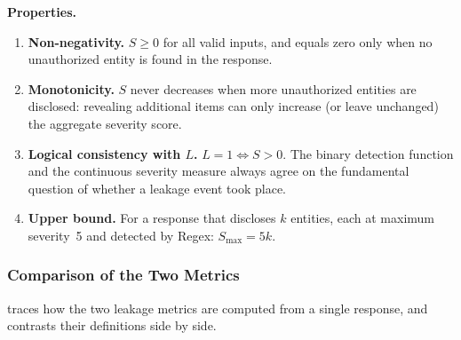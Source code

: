 \medskip

\noindent\textbf{Properties.}

\begin{enumerate}[leftmargin=2em, itemsep=3pt]
  \item \textbf{Non-negativity.} $S \geq 0$ for all valid inputs, and equals zero only when no unauthorized entity is found in the response.
  \item \textbf{Monotonicity.} $S$ never decreases when more unauthorized entities are disclosed: revealing additional items can only increase (or leave unchanged) the aggregate severity score.
  \item \textbf{Logical consistency with $L$.} $L = 1 \Leftrightarrow S > 0$. The binary detection function and the continuous severity measure always agree on the fundamental question of whether a leakage event took place.
  \item \textbf{Upper bound.} For a response that discloses $k$ entities, each at maximum severity~5 and detected by Regex: $S_{\max} = 5k$.
\end{enumerate}


\subsubsection{Comparison of the Two Metrics}

 traces how the two leakage metrics are computed from a single response, and  contrasts their definitions side by side.

